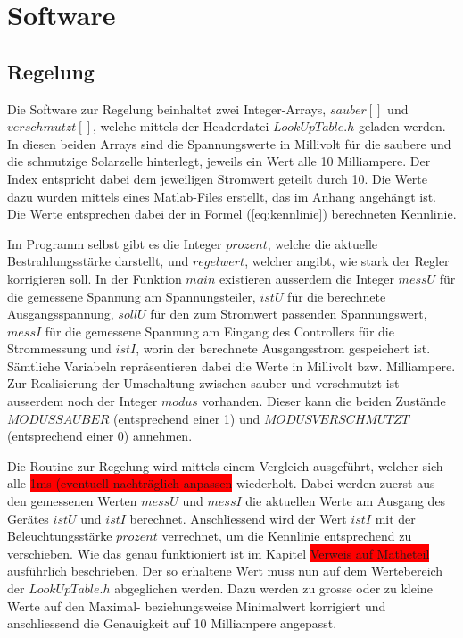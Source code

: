 \section{Software}

\subsection{Regelung}
Die Software zur Regelung beinhaltet zwei Integer-Arrays, $sauber[]$ und $verschmutzt[]$, welche mittels der Headerdatei $LookUpTable.h$ geladen werden. In diesen beiden Arrays sind die Spannungswerte in Millivolt für die saubere und die schmutzige Solarzelle hinterlegt, jeweils ein Wert alle 10 Milliampere. Der Index entspricht dabei dem jeweiligen Stromwert geteilt durch 10. \newline
Die Werte dazu wurden mittels eines Matlab-Files erstellt, das im Anhang angehängt ist. Die Werte entsprechen dabei der in Formel (\ref{eq:kennlinie}) berechneten Kennlinie.

Im Programm selbst gibt es die Integer $prozent$, welche die aktuelle Bestrahlungsstärke darstellt, und $regelwert$, welcher angibt, wie stark der Regler korrigieren soll. \newline
In der Funktion $main$ existieren ausserdem die Integer $messU$ für die gemessene Spannung am Spannungsteiler, $istU$ für die berechnete Ausgangsspannung, $sollU$ für den zum Stromwert passenden Spannungswert, $messI$ für die gemessene Spannung am Eingang des Controllers für die Strommessung und $istI$, worin der berechnete Ausgangsstrom gespeichert ist. Sämtliche Variabeln repräsentieren dabei die Werte in Millivolt bzw. Milliampere. \newline
Zur Realisierung der Umschaltung zwischen sauber und verschmutzt ist ausserdem noch der Integer $modus$ vorhanden. Dieser kann die beiden Zustände $MODUSSAUBER$ (entsprechend einer 1) und $MODUSVERSCHMUTZT$ (entsprechend einer 0) annehmen.

Die Routine zur Regelung wird mittels einem Vergleich ausgeführt, welcher sich alle \colorbox{red}{1ms (eventuell nachträglich anpassen} wiederholt. Dabei werden zuerst aus den gemessenen Werten $messU$ und $messI$ die aktuellen Werte am Ausgang des Gerätes $istU$ und $istI$ berechnet. \newline
Anschliessend wird der Wert $istI$ mit der Beleuchtungsstärke $prozent$ verrechnet, um die Kennlinie entsprechend zu verschieben. Wie das genau funktioniert ist im Kapitel \colorbox{red}{Verweis auf Matheteil} ausführlich beschrieben. \newline
Der so erhaltene Wert muss nun auf dem Wertebereich der $LookUpTable.h$ abgeglichen werden. Dazu werden zu grosse oder zu kleine Werte auf den Maximal- beziehungsweise Minimalwert korrigiert und anschliessend die Genauigkeit auf 10 Milliampere angepasst.

